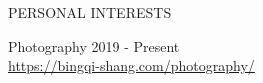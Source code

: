 \begin{rSection}{PERSONAL INTERESTS}

\small{
Photography \hfill 2019 - Present
\\ \href{https://bingqi-shang.com/photography/}{\textcolor{BS_color}{https://bingqi-shang.com/photography/}}
}

\end{rSection}
